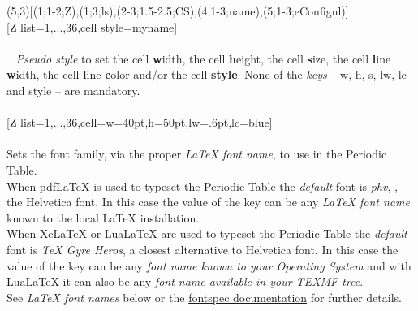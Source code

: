 (5,3)[(1;1-2;Z),(1;3;ls),(2-3;1.5-2.5;CS),(4;1-3;name),(5;1-3;eConfignl)]%
\\ [-4pt][Z list={1,...,36},cell style=myname]%
\\ [10pt]\makebox[\linewidth][c]{\scalebox{.6}{\pgfPT[Z list={1,...,36},cell style=myname]}}%
\\ [5pt]\pgfPTendoption%
\newpage\vspace{-34pt}\ %
\label{style_cell}%
%
{\textit{Pseudo style} to set the cell \textbf{w}idth, the cell \textbf{h}eight, the cell \textbf{s}ize, the cell \textbf{l}ine \textbf{w}idth, the cell \textbf{l}ine \textbf{c}olor and/or the cell \textbf{style}. None of the \textit{keys} -- w, h, s, lw, lc and style -- are mandatory.
\\ [3pt]%
}%
\\ [5pt][Z list={1,...,36},cell={w=40pt,h=50pt,lw=.6pt,lc=blue}]%
\\ [10pt]\makebox[\linewidth][c]{\scalebox{.6}{\pgfPT[Z list={1,...,36},cell={w=40pt,h=50pt,lw=.6pt,lc=blue}]}}%
\\ [5pt]\pgfPTendstyle%
\vfill%
\label{option_font}%
%
{Sets the font family, via the proper \textit{\textrm{\LaTeX} font name}, to use in the Periodic Table.
\\ [2pt]When \textrm{pdf\LaTeX} is used to typeset the Periodic Table the \textit{default} font is \textit{phv}, \ie, the Helvetica font. In this case the value of the  key can be any \textit{\textrm{\LaTeX} font name} known to the local \textrm{\LaTeX} installation.
\\ [2pt]When \textrm{Xe\LaTeX} or \textrm{Lua\LaTeX} are used to typeset the Periodic Table the \textit{default} font is \textit{TeX Gyre Heros}, a closest alternative to Helvetica font. In this case the value of the  key can be any \textit{font name known to your Operating System} and with \textrm{Lua\LaTeX} it can also be any \textit{font name available in your \textrm{TEXMF} tree}.
\\ \hfill\scriptsize See \textit{\textrm{\LaTeX} font names} below or the \href{https://ftp.eq.uc.pt/software/TeX/macros/unicodetex/latex/fontspec/fontspec.pdf\#page=9}{fontspec documentation} for further details.\normalsize\\ \ }%
